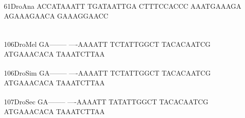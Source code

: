 \documentclass[11pt,twoside,reqno,a4paper]{article}
\begin{document}
{61\hspace*{2\charwidth}DroAna	ACCATAAATT	TGATAATTGA	CTTTCCACCC	AAATGAAAGA	AGAAAGAACA	GAAAGGAACC	\\
\hspace*{4\charwidth}\hspace*{7\charwidth}\hspace*{1\charwidth}\hspace*{1\charwidth}\hspace*{1\charwidth}\hspace*{1\charwidth}\hspace*{1\charwidth}\hspace*{1\charwidth}\\
\\
106\hspace*{1\charwidth}DroMel	GA--------	----AAAATT	TCTATTGGCT	TACACAATCG	ATGAAACACA	TAAATCTTAA	\\
\hspace*{4\charwidth}\hspace*{7\charwidth}\hspace*{1\charwidth}\hspace*{1\charwidth}\hspace*{1\charwidth}\hspace*{1\charwidth}\hspace*{1\charwidth}\hspace*{1\charwidth}\\
106\hspace*{1\charwidth}DroSim	GA--------	----AAAATT	TCTATTGGCT	TACACAATCG	ATGAAACACA	TAAATCTTAA	\\
\hspace*{4\charwidth}\hspace*{7\charwidth}\hspace*{1\charwidth}\hspace*{1\charwidth}\hspace*{1\charwidth}\hspace*{1\charwidth}\hspace*{1\charwidth}\hspace*{1\charwidth}\\
107\hspace*{1\charwidth}DroSec	GA--------	----AAAATT	TATATTGGCT	TACACAATCG	ATGAAACACA	TAAATCTTAA	\\
\hspace*{4\charwidth}\hspace*{7\charwidth}\hspace*{1\charwidth}\hspace*{1\charwidth}\hspace*{1\charwidth}\hspace*{1\charwidth}\hspace*{1\charwidth}\hspace*{1\charwidth}\\
}
\end{document}
